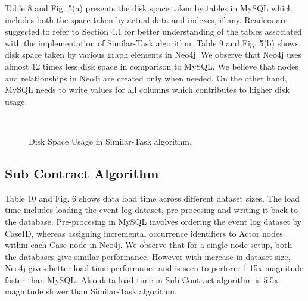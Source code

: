 \documentclass[11pt]{article}
\begin{document}
{{%

\par{Table 8 and Fig. 5(a) presents the disk space taken by tables in MySQL which includes both the space taken by actual data and indexes, if any. Readers are suggested to refer to Section 4.1 for better understanding of the tables associated with the implementation of Similar-Task algorithm. Table 9 and Fig. 5(b) shows disk space taken by various graph elements in Neo4j. We observe that Neo4j uses almost 12 times less disk space in comparison to MySQL. We believe that nodes and relationships in Neo4j are created only when needed. On the other hand, MySQL needs to write values for all columns which contributes to higher disk usage.}
\begin{figure}
  \centering
  \mbox{
    \quad
    }
  \caption{Disk Space Usage in Similar-Task algorithm.}
\end{figure}
\subsection{Sub Contract Algorithm}
\par{Table 10 and Fig. 6 shows data load time across different dataset sizes. The load time includes loading the event log dataset, pre-procesing and writing it back to the database. Pre-procesing in MySQL involves ordering the event log dataset by CaseID, whereas assigning incremental occurrence identifiers to Actor nodes within each Case node in Neo4j. We observe that for a single node setup, both the databases give similar performance. However with increase in dataset size, Neo4j gives better load time performance and is seen to perform 1.15x magnitude faster than MySQL. Also data load time in Sub-Contract algorithm is 5.5x magnitude slower than Similar-Task algorithm.}



}}
\end{document}
